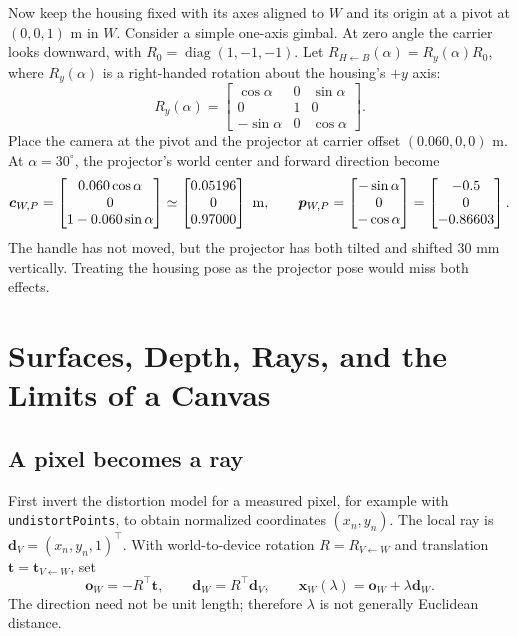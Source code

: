 \documentclass[11pt,a4paper]{article}
\newcommand{\Rot}[2]{R_{#1\leftarrow #2}}
\newcommand{\tr}[2]{\bm{t}_{#1\leftarrow #2}}
\newcommand{\pt}[1]{\bm{x}_{#1}}
\begin{document}
Now keep the housing fixed with its axes aligned to $W$ and its origin
at a pivot at $(0,0,1)$ m in $W$. Consider a simple one-axis gimbal.
At zero angle the carrier looks
downward, with $R_0=\operatorname{diag}(1,-1,-1)$.
Let $\Rot{H}{B}(\alpha)=R_y(\alpha)R_0$, where
$R_y(\alpha)$ is a right-handed rotation about the housing's $+y$ axis:
\begin{equation}
R_y(\alpha)=
\begin{bmatrix}
\cos\alpha&0&\sin\alpha\\
0&1&0\\
-\sin\alpha&0&\cos\alpha
\end{bmatrix}.
\end{equation}
Place the camera at the pivot and the projector at carrier offset
$(0.060,0,0)$ m. At $\alpha=30^\circ$, the projector's world center
and forward direction become
\begin{equation}
\bm{c}_{W,P}=
\begin{bmatrix}0.060\cos\alpha\\0\\1-0.060\sin\alpha\end{bmatrix}
\simeq
\begin{bmatrix}0.05196\\0\\0.97000\end{bmatrix}\ {\rm m},\qquad
\bm{p}_{W,P}=
\begin{bmatrix}-\sin\alpha\\0\\-\cos\alpha\end{bmatrix}
=\begin{bmatrix}-0.5\\0\\-0.86603\end{bmatrix}.
\end{equation}
The handle has not moved, but the projector has both tilted and shifted
30 mm vertically. Treating the housing pose as the projector pose would
miss both effects.

\section{Surfaces, Depth, Rays, and the Limits of a Canvas}
\label{sec:surfaces}

\subsection{A pixel becomes a ray}
First invert the distortion model for a measured pixel, for example with
\texttt{undistortPoints}, to obtain normalized coordinates $(x_n,y_n)$.
The local ray is $\bm{d}_V=(x_n,y_n,1)^\top$.
With world-to-device rotation $R=\Rot{V}{W}$ and translation
$\bm{t}=\tr{V}{W}$, set
\begin{equation}
\bm{o}_W=-R^\top\bm{t},\qquad
\bm{d}_W=R^\top\bm{d}_V,\qquad
\pt{W}(\lambda)=\bm{o}_W+\lambda\bm{d}_W .
\label{eq:ray}
\end{equation}
The direction need not be unit length; therefore $\lambda$ is not generally
Euclidean distance.
\end{document}
